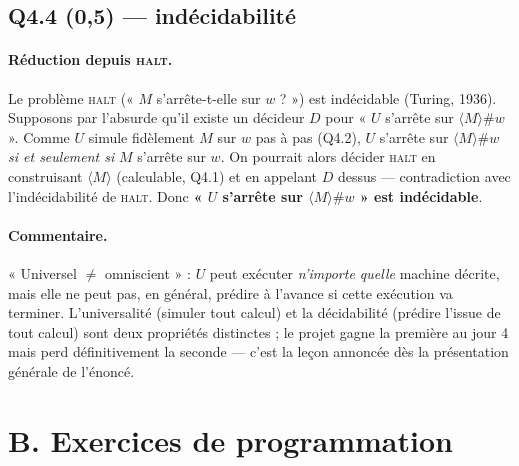 \documentclass[11pt,a4paper]{scrartcl}
\begin{document}
\subsection*{Q4.4 (0,5) — indécidabilité}

\paragraph{Réduction depuis \textsc{halt}.} Le problème \textsc{halt} (« $M$
s'arrête-t-elle sur $w$ ? ») est indécidable (Turing, 1936). Supposons par
l'absurde qu'il existe un décideur $D$ pour « $U$ s'arrête sur
$\langle M\rangle \# w$ ». Comme $U$ simule fidèlement $M$ sur $w$ pas à pas
(Q4.2), $U$ s'arrête sur $\langle M\rangle\#w$ \emph{si et seulement si} $M$
s'arrête sur $w$. On pourrait alors décider \textsc{halt} en construisant
$\langle M\rangle$ (calculable, Q4.1) et en appelant $D$ dessus — contradiction
avec l'indécidabilité de \textsc{halt}. Donc \textbf{« $U$ s'arrête sur
$\langle M\rangle\#w$ » est indécidable}.

\paragraph{Commentaire.} « Universel $\neq$ omniscient » : $U$ peut exécuter
\emph{n'importe quelle} machine décrite, mais elle ne peut pas, en général,
prédire à l'avance si cette exécution va terminer. L'universalité (simuler tout
calcul) et la décidabilité (prédire l'issue de tout calcul) sont deux propriétés
distinctes ; le projet gagne la première au jour 4 mais perd définitivement la
seconde — c'est la leçon annoncée dès la présentation générale de l'énoncé.

\section*{B. Exercices de programmation}
\end{document}
